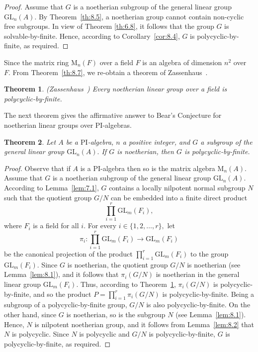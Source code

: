 \documentclass{amsart}
\newtheorem{theorem}{Theorem}[section]
\theoremstyle{definition}
\begin{document}
\begin{proof} Assume that $G$ is a noetherian subgroup of the general linear group $\mathrm{GL}_n(A).$ By Theorem~\ref{th:8.5}, a noetherian group cannot contain non-cyclic free subgroups. In view of Theorem \ref{th:6.8}, it follows that the group $G$ is solvable-by-finite. Hence, according to Corollary~\ref{cor:8.4}, $G$ is polycyclic-by-finite, as required.
\end{proof}
Since the matrix ring $\mathrm{M}_n(F)$ over a field $F$ is an algebra of dimension $n^2$ over $F.$ From Theorem~\ref{th:8.7}, we re-obtain a theorem of Zassenhaus~\cite[Theorem 1]{Zassenhaus_1969}.
\begin{theorem}\label{th:8.8}\textnormal{(Zassenhaus~\cite{Zassenhaus_1969})} Every noetherian linear group over a field is polycyclic-by-finite.
\end{theorem}
The next theorem gives the affirmative answer to Bear's Conjecture for noetherian linear groups over $\mathrm{PI}$-algebras.
\begin{theorem}\label{th:8.9} Let $A$ be a $\mathrm{PI}$-algebra, $n$ a positive integer, and $G$ a subgroup of the general linear group $\mathrm{GL}_n(A).$ If $G$ is noetherian, then $G$ is polycyclic-by-finite. 
\end{theorem}
\begin{proof} Observe that if $A$ is a PI-algebra then so is the matrix algebra $\mathrm{M}_n(A)$. Assume that $G$ is a noetherian subgroup of the general linear group $\mathrm{GL}_n(A).$ According to Lemma~\ref{lem:7.1}, $G$ contains a locally nilpotent normal subgroup $N$ such that the quotient group $G/N$ can be embedded into a finite direct product 
	$$\prod_{i=1}^{r}\mathrm{GL}_m(F_i),$$ 
	where $F_i$ is a field for all $i$. For every $i\in\{1,2,\ldots, r\},$ let 
	$$\pi_i: \prod_{i=1}^{r}\mathrm{GL}_m(F_i)\longrightarrow \mathrm{GL}_m(F_i)$$ be the canonical projection of the product $\prod_{i=1}^{r}\mathrm{GL}_m(F_i)$ to the group $\mathrm{GL}_m(F_i)$. Since $G$ is noetherian, the quotient group $G/N$ is noetherian (see Lemma~\ref{lem:8.1}), and it follows that $\pi_i(G/N)$ is noetherian in the general linear group $\mathrm{GL}_m(F_i).$ Thus, according to Theorem~\ref{th:8.8}, $\pi_i(G/N)$ is polycyclic-by-finite, and so the product $P=\prod_{i=1}^{r}\pi_i(G/N)$ is polycyclic-by-finite. Being a subgroup of a polycyclic-by-finite group,  $G/N$ is also polycyclic-by-finite. On the other hand, since $G$ is noetherian, so is the subgroup $N$ (see Lemma~\ref{lem:8.1}). Hence, $N$ is nilpotent noetherian group, and it follows from Lemma~\ref{lem:8.2} that $N$ is polycyclic. Since $N$ is polycyclic and $G/N$ is polycyclic-by-finite, $G$ is polycyclic-by-finite, as required.
\end{proof}
\end{document}
